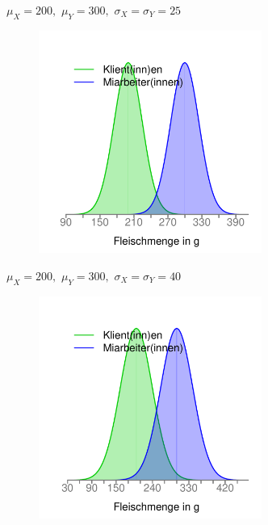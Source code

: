 \documentclass[usenames,dvipsnames,handout]{beamer}
\begin{document}
\begin{frame}{$\mu_{X}=200,$ $\mu_{Y}=300,$ $\sigma_{X}=\sigma_{Y}=25$}
  \begin{figure}[ht]
 	\centering
 	      \includegraphics[width=0.65\textwidth]{mx200my300sd25.pdf}%
 	\end{figure}
\end{frame}
%
\begin{frame}{$\mu_{X}=200,$ $\mu_{Y}=300,$ $\sigma_{X}=\sigma_{Y}=40$}
  \begin{figure}[ht]
 	\centering
 	      \includegraphics[width=0.65\textwidth]{mx200my300sd40.pdf}
 	\end{figure}
\end{frame}
%
\end{document}
